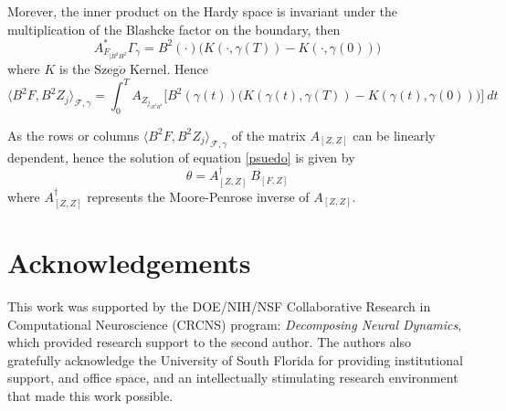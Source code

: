 \documentclass[preprint,12pt]{elsarticle} %
\theoremstyle{plain}
\theoremstyle{definition}
\theoremstyle{remark}
\begin{document}
Morever, the inner product on the Hardy space is invariant under the multiplication of the Blashcke factor on the boundary, then 
\[
A_{F_{|B^2H^2}}^{*}\Gamma_{\gamma}= B^2(\cdot)\big(K(\cdot, \gamma(T))-K(\cdot, \gamma(0))\big)
\]
where $K$ is the Szeg$\ddot{o}$ Kernel. Hence
\[
\langle B^2 F, B^2 Z_j\rangle_{\mathcal{F},\gamma} = \int_{0}^{T}A_{Z_{j_{|B^2H^2}}}\Big[B^2(\gamma(t))\Big(K(\gamma(t), \gamma(T))-K(\gamma(t), \gamma(0))\Big)\Big]~dt
\]

As the rows or columns $\langle B^2 F, B^2 Z_j\rangle_{\mathcal{F},\gamma}$ of the matrix $A_{[Z,Z]}$ can be linearly dependent, hence the solution of equation \ref{psuedo} is given by 
\[
\theta = A_{[Z,Z]}^{\dagger}~B_{[F,Z]}
\]
where $A_{[Z,Z]}^{\dagger}$ represents the Moore-Penrose inverse of $A_{[Z,Z]}$. 

\section{Acknowledgements}
This work was supported by the DOE/NIH/NSF Collaborative Research in Computational Neuroscience (CRCNS) program: \textit{Decomposing Neural Dynamics}, which provided research support to the second author. The authors also gratefully acknowledge the University of South Florida for providing institutional support, and office space, and an intellectually stimulating research environment that made this work possible. 




\end{document}

